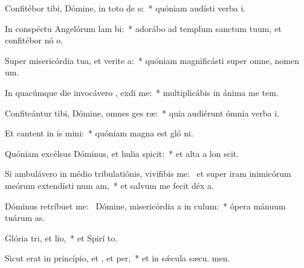\item Confitébor tibi, Dómine, in toto de o:~* quóniam audísti verba  i.
\item In conspéctu Angelórum lam bi:~* adorábo ad templum sanctum tuum, et confitébor nó o.
\item Super misericórdia tua, et verite a:~* quóniam magnificásti super omne, nomen  um.
\item In quacúmque die invocávero , exdi me:~* multiplicábis in ánima me tem.
\item Confiteántur tibi, Dómine, omnes ges ræ:~* quia audiérunt ómnia verba  i.
\item Et cantent in is mini:~* quóniam magna est gló ni.
\item Quóniam excélsus Dóminus, et hulia spicit:~* et alta a lon scit.
\item Si ambulávero in médio tribulatiónis, vivifibis me:~\pscross{} et super iram inimicórum meórum extendísti num am,~* et salvum me fecit déx a.
\item Dóminus retríbuet  me:~\pscross{} Dómine, misericórdia a in culum:~* ópera mánuum tuárum  as.
\item Glória tri, et lio,~* et Spirí to.
\item Sicut erat in princípio, et , et per,~* et in sǽcula sæcu. men.
